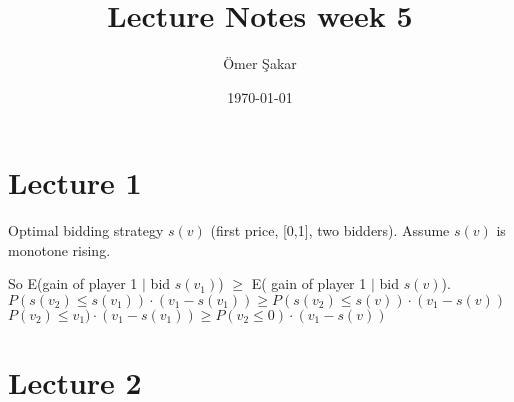 \documentclass[12pt]{scrartcl}
\title{Lecture Notes week 5}
\author{\"Omer \c Sakar}
\date{\today}
\begin{document}
\maketitle
\tableofcontents
\newpage

\section{Lecture 1}

Optimal bidding strategy $s(v)$ (first price, [0,1], two bidders).
Assume $s(v)$ is monotone rising.

So E(gain of player 1 $|$ bid $s(v_{1})$) $\geq$ E( gain of player 1 $|$ bid $s(v)$).\\
$P(s(v_{2})\leq s(v_{1}))\cdot (v_{1} - s(v_{1}))\geq P(s(v_{2})\leq s(v))\cdot (v_{1} - s(v))$\\
$P(v_{2})\leq v_{1})\cdot (v_{1} - s(v_{1}))\geq P(v_{2}\leq 0)\cdot (v_{1} - s(v))$\\



\clearpage
\section{Lecture 2} 
\end{document}
